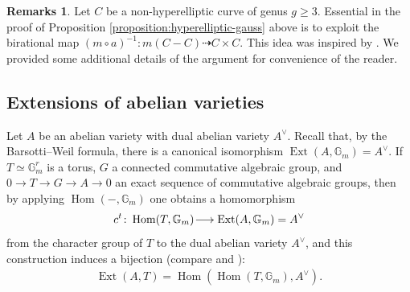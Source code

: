 \documentclass[a4paper,11pt,reqno]{amsart}
\makeatletter
\numberwithin{equation}{section}
\theoremstyle{plain}
\theoremstyle{definition}
\newtheorem{remarks}[theorem]{Remarks}
\newcommand{\G}{\mathbb G}
\newcommand{\Hom}{\operatorname{Hom}}
\newcommand{\Ext}{\operatorname{Ext}}
\renewcommand{\longrightarrow}{\xymatrix@1@=15pt{\ar[r]&}}
\renewcommand{\cong}{\simeq}
\makeatother
\begin{document}
\begin{remarks} Let $C$ be a non-hyperelliptic curve of genus $g \geq 3$. Essential in the proof of Proposition \ref{proposition:hyperelliptic-gauss} above is to exploit the birational map $(m \circ a)^{-1} \colon m(C-C) \dashrightarrow C \times C$. This idea was inspired by \cite[page 902]{naranjopirola2018}. 
We provided some additional details of the argument for convenience of the reader.
\end{remarks}
 \subsection{Extensions of abelian varieties} \label{section:extensionnodal}
 
Let $A$ be an abelian variety with dual abelian variety $A^\vee$.  
Recall that, by the Barsotti--Weil formula, there is a canonical isomorphism 
$ 
\Ext(A, \G_m) = A^\vee$. 
If $T \cong \G_m^r$ is a torus, $G$ a connected commutative algebraic group, and $0\to  T \to G \to A \to 0$ an exact sequence of commutative algebraic groups, then by applying $\Hom(-, \G_m)$ one obtains a homomorphism 
$$
c^t \colon \Hom(T,\G_m) \longrightarrow \Ext(A, \G_m) 
= A^\vee$$
from the character group of $T$ to the dual abelian variety $A^\vee$, and this construction induces a bijection 
(compare \cite[Proposition 2]{carlson-extensions} and \cite[Chapter II, Section 2]{chai-siegelcompactifications}):
\begin{align} \label{equation:extAVdual}
\Ext(A,T) = \Hom\left( \Hom(T,\G_m), A^\vee \right). 
\end{align}
\end{document}
